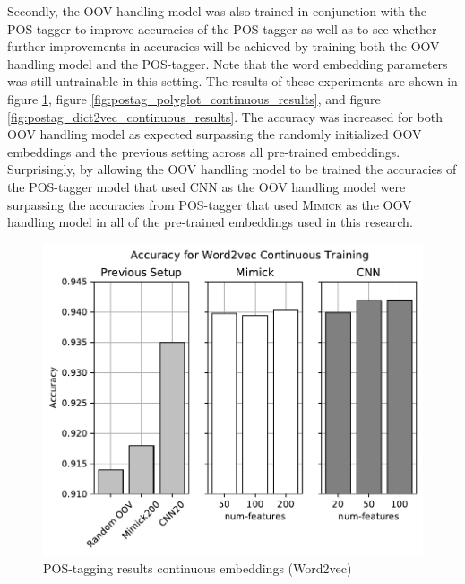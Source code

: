       Secondly, the OOV handling model was also trained in conjunction
      with the POS-tagger to improve accuracies of the POS-tagger as
      well as to see whether further improvements in accuracies will
      be achieved by training both the OOV handling model and the
      POS-tagger. Note that the word embedding parameters was still
      untrainable in this setting. The results of these experiments
      are shown in figure
      \ref{fig:postag_word2vec_continuous_results}, figure
      \ref{fig:postag_polyglot_continuous_results}, and figure
      \ref{fig:postag_dict2vec_continuous_results}. The accuracy was
      increased for both OOV handling model as expected surpassing the
      randomly initialized OOV embeddings and the previous setting
      across all pre-trained embeddings. Surprisingly, by allowing the
      OOV handling model to be trained the accuracies of the
      POS-tagger model that used CNN as the OOV handling model were
      surpassing the accuracies from POS-tagger that used
      \textsc{Mimick} as the OOV handling model in all of the
      pre-trained embeddings used in this research.
      \begin{figure}[H]
        \centering
        \includegraphics[width=0.8\linewidth]{images/continuous_word2vec.pdf}
        \caption{POS-tagging results continuous embeddings (Word2vec)}
        \label{fig:postag_word2vec_continuous_results}
      \end{figure}
